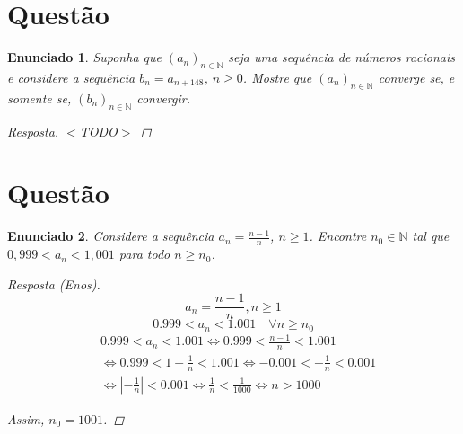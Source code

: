 \documentclass[a4paper,twoside,11pt]{article}
\newtheorem*{enunciado}{Enunciado}
\begin{document}
\section{Questão}
\begin{enunciado}
    Suponha que $(a_n)_{n \in \mathbb{N}}$ seja uma sequência de números racionais
    e considere a sequência $b_n = a_{n + 148}$, $n \geq 0$. Mostre que $(a_n)_{n \in \mathbb{N}}$
    converge se, e somente se, $(b_n)_{n \in \mathbb{N}}$ convergir.

    \begin{proof}[Resposta]
        $<$TODO$>$
    \end{proof}
\end{enunciado}



\section{Questão}
\begin{enunciado}
    Considere a sequência $a_n = \frac{n - 1}{n}$, $n \geq 1$. Encontre $n_0 \in \mathbb{N}$
    tal que $0,999 < a_n < 1,001$ para todo $n \geq n_0$.

    \begin{proof}[Resposta (Enos)]
        $$a_n = \frac{n - 1}{n}, n \geq 1$$
        $$0.999 < a_n < 1.001 \quad \forall n \geq n_0$$
        \begin{align*}
            &0.999 < a_n < 1.001 \iff 0.999 < \frac{n - 1}{n} < 1.001\\
            &\iff 0.999 < 1 - \frac{1}{n} < 1.001 \iff -0.001 < -\frac{1}{n} < 0.001\\
            &\iff |-\frac{1}{n}| < 0.001 \iff \frac{1}{n} < \frac{1}{1000} \iff n > 1000
        \end{align*}

        Assim, $n_0 = 1001$.
    \end{proof}
\end{enunciado}
\end{document}
